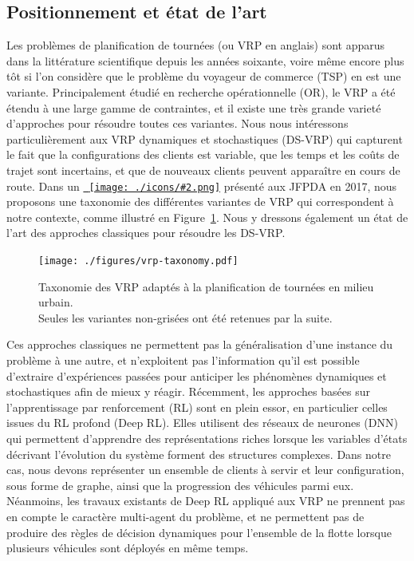 \documentclass[a4paper, 11pt]{article}
\newcommand{\useicon}[2][8pt]{\texttt{[image: ./icons/\#2.png]}}
\newcommand{\jumpto}[2]{\hyperref[#2]{\color{cyan!70!black}{#1}~\useicon{jump}}}
\begin{document}
    \subsection*{Positionnement et {\'etat} de l'art}
    \hspace{7mm}Les probl{\`e}mes de planification de tourn{\'e}es (ou VRP en anglais) sont apparus dans la litt{\'e}rature scientifique depuis les ann{\'e}es soixante,
    voire m{\^e}me encore plus t{\^o}t si l'on consid{\`e}re que le probl{\`e}me du voyageur de commerce (TSP) en est une variante.
    Principalement {\'e}tudi{\'e} en recherche op{\'e}rationnelle (OR), le VRP a {\'e}t{\'e} {\'e}tendu {\`a} une large gamme de contraintes,
    et il existe une tr{\`e}s grande variet{\'e} d'approches pour r{\'e}soudre toutes ces variantes.
    Nous nous int{\'e}ressons particuli{\`e}rement aux VRP dynamiques et stochastiques (DS-VRP) qui capturent le fait que la configurations des clients est variable,
    que les temps et les co{\^u}ts de trajet sont incertains, et que de nouveaux clients peuvent appara{\^i}tre en cours de route.
    Dans un \jumpto{article}{ref:jfpda:17} pr{\'e}sent{\'e} aux JFPDA en 2017, nous proposons une taxonomie des diff{\'e}rentes variantes de VRP
    qui correspondent {\`a} notre contexte, comme illustr{\'e} en Figure~\ref{fig:vrp:taxo}.
    Nous y dressons {\'e}galement un {\'e}tat de l'art des approches classiques pour r{\'e}soudre les DS-VRP.

    \begin{figure}[h]
        \centering
        \texttt{[image: ./figures/vrp-taxonomy.pdf]}
        \caption{Taxonomie des VRP adapt{\'e}s {\`a} la planification de tourn{\'e}es en milieu urbain. \\
        Seules les variantes non-gris{\'e}es ont {\'e}t{\'e} retenues par la suite.}
        \label{fig:vrp:taxo}
    \end{figure}

    \hspace{7mm}Ces approches classiques ne permettent pas la g{\'e}n{\'e}ralisation d'une instance du probl{\`e}me {\`a} une autre,
    et n'exploitent pas l'information qu'il est possible d'extraire d'exp{\'e}riences pass{\'e}es
    pour anticiper les ph{\'e}nom{\`e}nes dynamiques et stochastiques afin de mieux y r{\'e}agir.
    R{\'e}cemment, les approches bas{\'e}es sur l'apprentissage par renforcement (RL) sont en plein essor,
    en particulier celles issues du RL profond (Deep RL). Elles utilisent des r{\'e}seaux de neurones (DNN)
    qui permettent d'apprendre des repr{\'e}sentations riches lorsque les variables d'{\'e}tats d{\'e}crivant l'{\'e}volution du syst{\`e}me
    forment des structures complexes. Dans notre cas, nous devons repr{\'e}senter un ensemble de clients {\`a} servir et leur configuration,
    sous forme de graphe, ainsi que la progression des v{\'e}hicules parmi eux.
    N{\'e}anmoins, les travaux existants de Deep RL appliqu{\'e} aux VRP ne prennent pas en compte le caract{\`e}re multi-agent du probl{\`e}me,
    et ne permettent pas de produire des r{\`e}gles de d{\'e}cision dynamiques pour l'ensemble de la flotte
    lorsque plusieurs v{\'e}hicules sont d{\'e}ploy{\'e}s en m{\^e}me temps.
\end{document}
